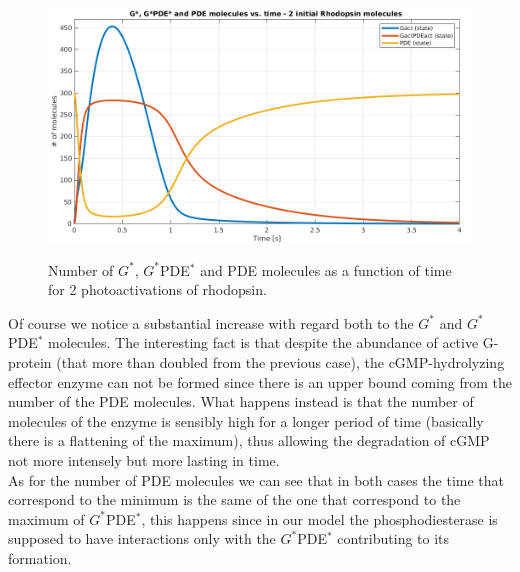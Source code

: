 \documentclass[pdf, color,12pt]{CITnote}
\begin{document}
\begin{figure}[ht!]
\centering
\centerline{$\  $ \includegraphics[scale=0.38]{seconda.png}}
\caption{\small{Number of $G^*$, $G^*$PDE$^*$ and PDE molecules as a function of time for 2 photoactivations of rhodopsin.}}
\label{fig: three}
\end{figure}
Of course we notice a substantial increase with regard both to the $G^*$ and $G^*$PDE$^*$ molecules. The interesting fact is that despite the abundance of active G-protein (that more than doubled from the previous case), the cGMP-hydrolyzing effector enzyme can not be formed since there is an upper bound coming from the number of the PDE molecules. What happens instead is that the number of molecules of the enzyme is sensibly high for a longer period of time (basically there is a flattening of the maximum), thus allowing the degradation of cGMP not more intensely but more lasting in time.
\\ As for the number of PDE molecules we can see that in both cases the time that correspond to the minimum is the same of the one that correspond to the maximum of $G^*$PDE$^*$, this happens since in our model the phosphodiesterase is supposed to have interactions only with the $G^*$PDE$^*$ contributing to its formation.

\newpage
\end{document}
